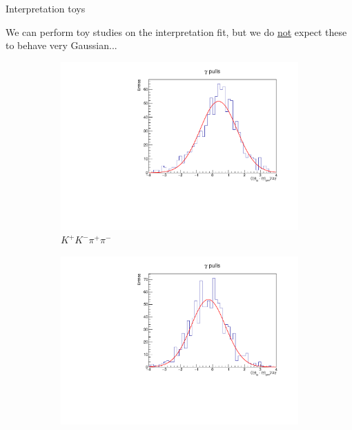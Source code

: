 \documentclass{beamer}
\begin{document}
\begin{frame}{Interpretation toys}
  \begin{center}
    We can perform toy studies on the interpretation fit, but we do \underline{not} expect these to behave very Gaussian...
  \end{center}
  \begin{figure}
    \centering
    \begin{subfigure}{0.5\textwidth}
      \centering
      \includegraphics[width=1.0\textwidth]{Plots/gamma_pull_toys_KKpipi.pdf}
      \vspace{-0.3cm}
      \caption*{$K^+K^-\pi^+\pi^-$}
    \end{subfigure}%
    \begin{subfigure}{0.5\textwidth}
      \centering
      \includegraphics[width=1.0\textwidth]{Plots/gamma_pull_toys_pipipipi.pdf}

\end{subfigure}
\end{figure}
\end{frame}
\end{document}

